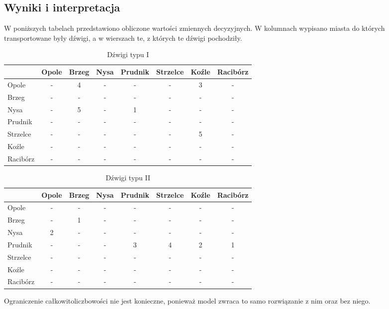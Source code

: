 \documentclass{article}
\begin{document}
\subsection{Wyniki i interpretacja}

W poniższych tabelach przedstawiono obliczone wartości zmiennych decyzyjnych. W kolumnach wypisano miasta do których transportowane były dźwigi, a w wierszach te, z których te dźwigi pochodziły.

\begin{table}[H]
\centering
\begin{tabular}{l|c c c c c c c}
 & Opole & Brzeg & Nysa & Prudnik & Strzelce & Koźle & Racibórz\\\hline
Opole & - & 4 & - & - & - & 3 & -\\\hline
Brzeg & - & - & - & - & - & - & -\\\hline
Nysa & - & 5 & - & 1 & - & - & -\\\hline
Prudnik & - & - & - & - & - & - & -\\\hline
Strzelce & - & - & - & - & - & 5 & -\\\hline
Koźle & - & - & - & - & - & - & -\\\hline
Racibórz & - & - & - & - & - & - & -\\\hline
\end{tabular}
\caption{Dźwigi typu I}
\end{table}

\begin{table}[H]
\centering
\begin{tabular}{l|c c c c c c c}
 & Opole & Brzeg & Nysa & Prudnik & Strzelce & Koźle & Racibórz\\\hline
Opole & - & - & - & - & - & - & -\\\hline
Brzeg & - & 1 & - & - & - & - & -\\\hline
Nysa & 2 & - & - & - & - & - & -\\\hline
Prudnik & - & - & - & 3 & 4 & 2 & 1\\\hline
Strzelce & - & - & - & - & - & - & -\\\hline
Koźle & - & - & - & - & - & - & -\\\hline
Racibórz & - & - & - & - & - & - & -\\\hline
\end{tabular}
\caption{Dźwigi typu II}
\end{table}

Ograniczenie całkowitoliczbowości nie jest konieczne, ponieważ model zwraca to samo rozwiązanie z nim oraz bez niego.
\end{document}
